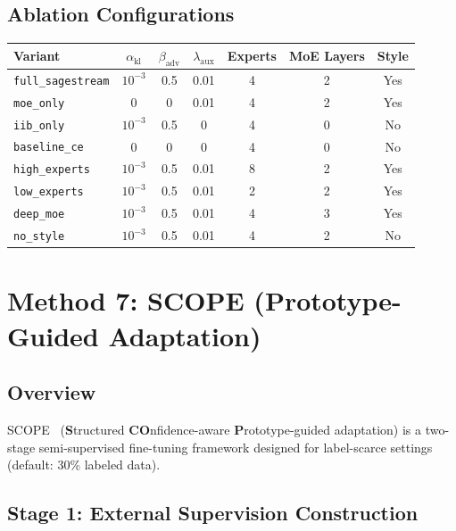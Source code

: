 \documentclass{article}
\begin{document}
\subsection{Ablation Configurations}

\begin{table}[h]
\centering
\small
\begin{tabular}{@{}lcccccc@{}}
\toprule
Variant & $\alpha_\text{kl}$ & $\beta_\text{adv}$ & $\lambda_\text{aux}$ & Experts & MoE Layers & Style \\
\midrule
\texttt{full\_sagestream} & $10^{-3}$ & 0.5 & 0.01 & 4 & 2 & Yes \\
\texttt{moe\_only} & 0 & 0 & 0.01 & 4 & 2 & Yes \\
\texttt{iib\_only} & $10^{-3}$ & 0.5 & 0 & 4 & 0 & No \\
\texttt{baseline\_ce} & 0 & 0 & 0 & 4 & 0 & No \\
\texttt{high\_experts} & $10^{-3}$ & 0.5 & 0.01 & 8 & 2 & Yes \\
\texttt{low\_experts} & $10^{-3}$ & 0.5 & 0.01 & 2 & 2 & Yes \\
\texttt{deep\_moe} & $10^{-3}$ & 0.5 & 0.01 & 4 & 3 & Yes \\
\texttt{no\_style} & $10^{-3}$ & 0.5 & 0.01 & 4 & 2 & No \\
\bottomrule
\end{tabular}
\end{table}

\section{Method 7: SCOPE (Prototype-Guided Adaptation)}
\label{sec:scope}

\subsection{Overview}

SCOPE~\cite{zhou2025scope} (\textbf{S}tructured \textbf{CO}nfidence-aware \textbf{P}rototype-guided adaptation) is a two-stage semi-supervised fine-tuning framework designed for label-scarce settings (default: 30\% labeled data).

\subsection{Stage 1: External Supervision Construction}
\end{document}
